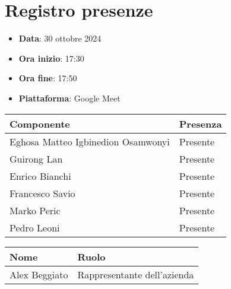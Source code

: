 \documentclass[a4paper, 12pt]{article}
\begin{document}
\section{Registro presenze}
\begin{itemize}
    \item[] \textbf{Data}: 30 ottobre 2024
    \item[] \textbf{Ora inizio}:  17:30
    \item[] \textbf{Ora fine}: 17:50
    \item[] \textbf{Piattaforma}: Google Meet	
\end{itemize}
\begin{table}[!h]
\centering
{\renewcommand{\arraystretch}{2}
\begin{tabularx}{\textwidth}{| X | X |}
    \hline
        \textbf{\large Componente} & 
        \textbf{\large Presenza} \\ 
    \hline 
    \hline
        Eghosa Matteo Igbinedion Osamwonyi&
        Presente \\
    \hline 
        Guirong Lan&
        Presente \\
    \hline 
        Enrico Bianchi&
        Presente \\
    \hline 
        Francesco Savio&
        Presente \\
    \hline 
        Marko Peric&
        Presente \\
    \hline 
        Pedro Leoni&
        Presente \\
    \hline 

\end{tabularx}}
\end{table}

\begin{table}[!h]
    \centering
    {\renewcommand{\arraystretch}{2}
    \begin{tabularx}{\textwidth}{| X | X |}
        \hline
            \textbf{\large Nome} & 
            \textbf{\large Ruolo} \\ 
        \hline 
        \hline
            Alex Beggiato&
            Rappresentante dell'azienda \\
        \hline 
    
    \end{tabularx}}
\end{table}

\newpage
\end{document}
